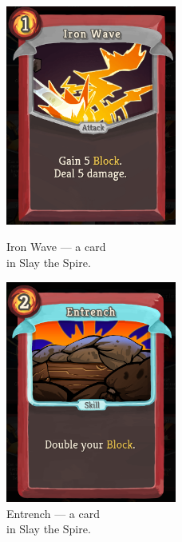 \begin{figure}
    \centering
    \begin{minipage}{.5\textwidth}
        \centering
        \captionsetup{justification=centering}
        \includegraphics[width=0.5\textwidth]{img/Slay-the-Spire-Iron-Wave.png}
        \caption{Iron Wave --- a card\\in Slay the Spire.}
        \label{fig:slay-the-spire-iron-wave}
    \end{minipage}%
    \begin{minipage}{.5\textwidth}
        \centering
        \captionsetup{justification=centering}
        \includegraphics[width=0.5\textwidth]{img/Slay-the-Spire-Entrench.png}
        \caption{Entrench --- a card\\in Slay the Spire.}
        \label{fig:slay-the-spire-entrench}
    \end{minipage}
\end{figure}

